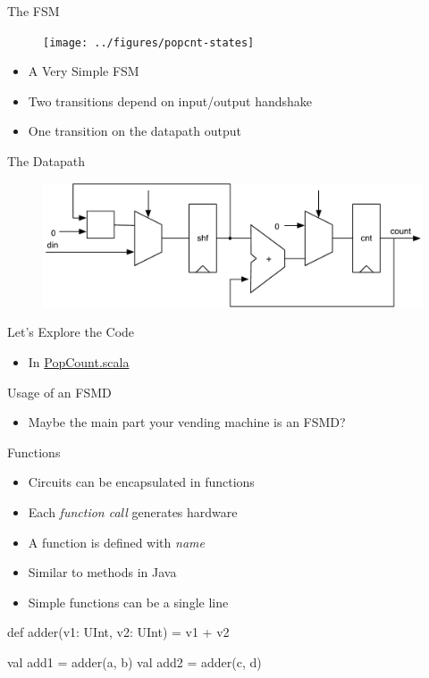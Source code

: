 \begin{frame}[fragile]{The FSM}
\begin{figure}
  \texttt{[image: ../figures/popcnt-states]}
\end{figure}
\begin{itemize}
\item A Very Simple FSM
\item Two transitions depend on input/output handshake
\item One transition on the datapath output
\end{itemize}
\end{frame}

\begin{frame}[fragile]{The Datapath}
\begin{figure}
  \includegraphics[scale=0.65]{../figures/popcnt-data}
\end{figure}
\end{frame}

\begin{frame}[fragile]{Let's Explore the Code}
\begin{itemize}
\item In \href{https://github.com/schoeberl/chisel-book/blob/master/src/main/scala/PopCount.scala}{PopCount.scala}
\end{itemize}
\end{frame}

\begin{frame}[fragile]{Usage of an FSMD}
\begin{itemize}
\item Maybe the main part your vending machine is an FSMD?
\end{itemize}
\end{frame}


\begin{frame}[fragile]{Functions}
\begin{itemize}
\item Circuits can be encapsulated in functions
\item Each \emph{function call} generates hardware
\item A function is defined with  \emph{name}
\item Similar to methods in Java
\item Simple functions can be a single line
\end{itemize}
\begin{chisel}
  def adder(v1: UInt, v2: UInt) = v1 + v2
  
  val add1 = adder(a, b)
  val add2 = adder(c, d)
\end{chisel}
\end{frame}

